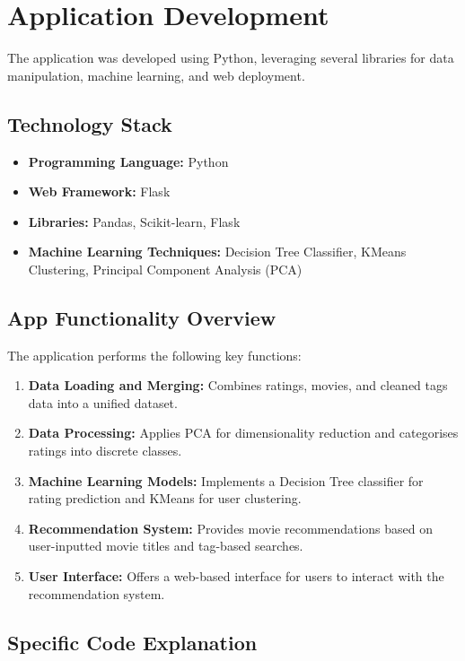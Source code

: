 \documentclass[conference]{IEEEtran}
\begin{document}
\section{Application Development}
The application was developed using Python, leveraging several libraries for data manipulation, machine learning, and web deployment.

\subsection{Technology Stack}
\begin{itemize}
    \item \textbf{Programming Language:} Python
    \item \textbf{Web Framework:} Flask
    \item \textbf{Libraries:} Pandas, Scikit-learn, Flask
    \item \textbf{Machine Learning Techniques:} Decision Tree Classifier, KMeans Clustering, Principal Component Analysis (PCA)
\end{itemize}

\subsection{App Functionality Overview}
The application performs the following key functions:
\begin{enumerate}
    \item \textbf{Data Loading and Merging:} Combines ratings, movies, and cleaned tags data into a unified dataset.
    \item \textbf{Data Processing:} Applies PCA for dimensionality reduction and categorises ratings into discrete classes.
    \item \textbf{Machine Learning Models:} Implements a Decision Tree classifier for rating prediction and KMeans for user clustering.
    \item \textbf{Recommendation System:} Provides movie recommendations based on user-inputted movie titles and tag-based searches.
    \item \textbf{User Interface:} Offers a web-based interface for users to interact with the recommendation system.
\end{enumerate}

\subsection{Specific Code Explanation}
\end{document}
